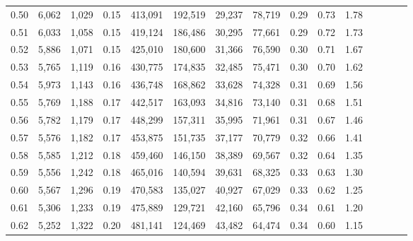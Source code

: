 \begin{tabular}{rrrcrrrrrrrrrrr}
0.50 &   6,062 &   1,029 &                                       0.15 &  413,091 &  192,519 &   29,237 &   78,719 &  0.29 &  0.73 &                         1.78 \\
0.51 &   6,033 &   1,058 &                                       0.15 &  419,124 &  186,486 &   30,295 &   77,661 &  0.29 &  0.72 &                         1.73 \\
0.52 &   5,886 &   1,071 &                                       0.15 &  425,010 &  180,600 &   31,366 &   76,590 &  0.30 &  0.71 &                         1.67 \\
0.53 &   5,765 &   1,119 &                                       0.16 &  430,775 &  174,835 &   32,485 &   75,471 &  0.30 &  0.70 &                         1.62 \\
0.54 &   5,973 &   1,143 &                                       0.16 &  436,748 &  168,862 &   33,628 &   74,328 &  0.31 &  0.69 &                         1.56 \\
0.55 &   5,769 &   1,188 &                                       0.17 &  442,517 &  163,093 &   34,816 &   73,140 &  0.31 &  0.68 &                         1.51 \\
0.56 &   5,782 &   1,179 &                                       0.17 &  448,299 &  157,311 &   35,995 &   71,961 &  0.31 &  0.67 &                         1.46 \\
0.57 &   5,576 &   1,182 &                                       0.17 &  453,875 &  151,735 &   37,177 &   70,779 &  0.32 &  0.66 &                         1.41 \\
0.58 &   5,585 &   1,212 &                                       0.18 &  459,460 &  146,150 &   38,389 &   69,567 &  0.32 &  0.64 &                         1.35 \\
0.59 &   5,556 &   1,242 &                                       0.18 &  465,016 &  140,594 &   39,631 &   68,325 &  0.33 &  0.63 &                         1.30 \\
0.60 &   5,567 &   1,296 &                                       0.19 &  470,583 &  135,027 &   40,927 &   67,029 &  0.33 &  0.62 &                         1.25 \\
0.61 &   5,306 &   1,233 &                                       0.19 &  475,889 &  129,721 &   42,160 &   65,796 &  0.34 &  0.61 &                         1.20 \\
0.62 &   5,252 &   1,322 &                                       0.20 &  481,141 &  124,469 &   43,482 &   64,474 &  0.34 &  0.60 &                         1.15 \\

\end{tabular}

